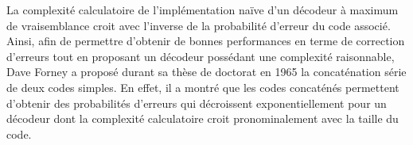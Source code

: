 La complexité calculatoire de l’implémentation naïve d'un décodeur à maximum de vraisemblance croit avec l'inverse de la 
probabilité d'erreur du code associé. Ainsi, afin de permettre d'obtenir de bonnes performances en terme de correction 
d'erreurs tout en proposant un décodeur possédant une complexité raisonnable, Dave Forney a proposé durant sa thèse de 
doctorat en 1965 la concaténation série de deux codes \og simples\fg \cite{forney1966concatenated}. En effet, il a montré 
que les codes concaténés permettent d'obtenir des probabilités d'erreurs qui décroissent exponentiellement pour un décodeur dont la 
complexité calculatoire croit pronominalement avec la taille du code.

